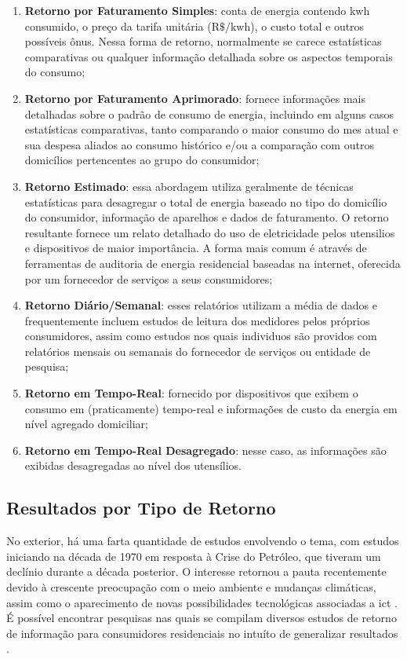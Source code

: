 \begin{enumerate}
\item \textbf{Retorno por Faturamento Simples}: conta de energia contendo 
k\acrshort{wh} 
consumido, o preço da tarifa unitária ($\text{R\$}/$k\acrshort{wh}), o custo 
total e outros possíveis ônus. Nessa forma de retorno, normalmente se carece 
estatísticas comparativas ou qualquer informação detalhada sobre os aspectos 
temporais do consumo;
\item \textbf{Retorno por Faturamento Aprimorado}: fornece informações mais 
detalhadas
sobre o padrão de consumo de energia, incluindo em alguns casos estatísticas
comparativas, tanto comparando o maior consumo do mes atual e sua despesa
aliados ao consumo histórico e/ou a comparação com outros domicílios
pertencentes ao grupo do consumidor;
\item \textbf{Retorno Estimado}: essa abordagem utiliza geralmente de técnicas
estatísticas para desagregar o total de energia baseado no tipo do
domicílio do consumidor, informação de aparelhos e dados de faturamento. O
retorno resultante fornece um relato detalhado do uso de eletricidade pelos
utensilios e dispositivos de maior importância. A forma mais comum é através de
ferramentas de auditoria de energia residencial baseadas na internet, oferecida
por um fornecedor de serviços a seus consumidores;
\item \textbf{Retorno Diário/Semanal}: esses relatórios utilizam a média de
dados e frequentemente incluem estudos de leitura dos medidores pelos próprios 
consumidores, assim como estudos nos quais individuos são providos com
relatórios mensais ou semanais do fornecedor de serviços ou entidade de
pesquisa;
\item \textbf{Retorno em Tempo-Real}: fornecido por dispositivos que exibem o
consumo em (praticamente) tempo-real e informações de custo da energia em nível
agregado domiciliar;
\item \textbf{Retorno em Tempo-Real Desagregado}: nesse caso, as informações são
exibidas desagregadas ao nível dos utensílios.
\end{enumerate}

\subsection{Resultados por Tipo de Retorno}
\label{ssec:ret_eff}

No exterior, há uma farta quantidade de estudos envolvendo o tema, com estudos iniciando na
década de 1970 em resposta à Crise do Petróleo, que tiveram um declínio durante
a década posterior. O interesse retornou a pauta recentemente devido à crescente 
preocupação com o meio ambiente e mudanças climáticas, assim 
como o aparecimento de novas possibilidades tecnológicas 
associadas a \gls{ict} \cite{aceee_2010_estudos_feedback}. É
possível encontrar pesquisas nas quais se compilam diversos estudos
de retorno de informação para consumidores residenciais no intuíto de generalizar 
resultados \cite{aceee_2010_estudos_feedback,2011_zhifeng_smart_energy_savings,
2006_darby,2009_nber_studies_us,ucla_studies_1975_2011_usa}.

